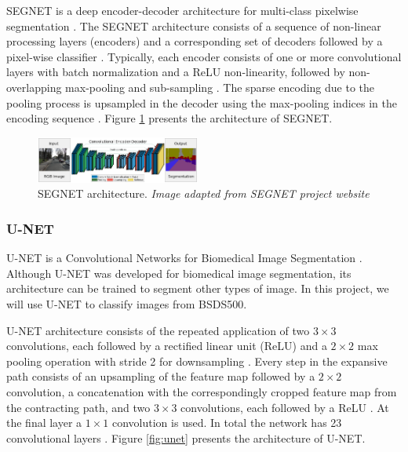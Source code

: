 \documentclass[10pt,twocolumn,letterpaper]{article}
\begin{document}
SEGNET is a deep encoder-decoder architecture for multi-class pixelwise segmentation \cite{SEGNET}. The SEGNET architecture consists of a sequence of non-linear processing layers (encoders) and a corresponding set of decoders followed by a pixel-wise classifier \cite{SEGNET} \cite{SEGNET_WEBSITE}. Typically, each encoder consists of one or more convolutional layers with batch normalization and a ReLU non-linearity, followed by non-overlapping max-pooling and sub-sampling \cite{SEGNET} \cite{SEGNET_WEBSITE}. The sparse encoding due to the pooling process is upsampled in the decoder using the max-pooling indices in the encoding sequence \cite{SEGNET} \cite{SEGNET_WEBSITE}. Figure \ref{fig:segnet} presents the architecture of SEGNET.

\begin{figure}[ht]
  \centering
  \includegraphics[width=0.48\textwidth]{segnet.png}
  \caption{SEGNET architecture. \textit{Image adapted from SEGNET project website} \cite{SEGNET_WEBSITE} \cite{SEGNET}}
  \label{fig:segnet}
\end{figure}


\subsubsection{U-NET} \label{sssec:unet}

U-NET is a Convolutional Networks for Biomedical Image Segmentation \cite{UNET} \cite{UNET_WEBSITE}. Although U-NET was developed for biomedical image segmentation, its architecture can be trained to segment other types of image. In this project, we will use U-NET to classify images from BSDS500.

U-NET architecture consists of the repeated application of two $3 \times 3$ convolutions, each followed by a rectified linear unit (ReLU) and a $2 \times 2$ max pooling operation with stride 2 for downsampling \cite{UNET}. Every step in the expansive path consists of an upsampling of the feature map followed by a $2 \times 2$ convolution, a concatenation with the correspondingly cropped feature map from the contracting path, and two $3 \times 3$ convolutions, each followed by a ReLU \cite{UNET}. At the final layer a $1 \times 1$ convolution is used. In total the network has 23 convolutional layers \cite{UNET}. Figure \ref{fig:unet} presents the  architecture of U-NET.
\end{document}
